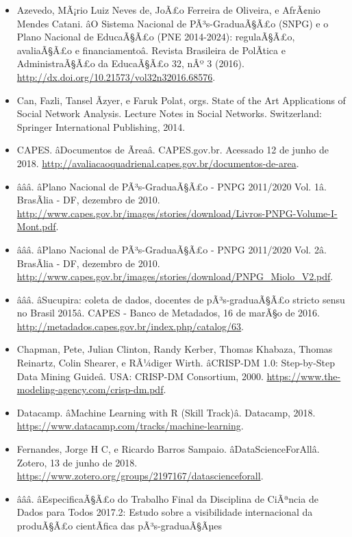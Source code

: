 \documentclass[]{article}
\providecommand{\tightlist}{%
  \setlength{\itemsep}{0pt}\setlength{\parskip}{0pt}}
\begin{document}
\begin{itemize}
\tightlist
\item
  Azevedo, MÃ¡rio Luiz Neves de, JoÃ£o Ferreira de Oliveira, e AfrÃ¢nio
  Mendes Catani. âO Sistema Nacional de PÃ³s-GraduaÃ§Ã£o (SNPG) e o
  Plano Nacional de EducaÃ§Ã£o (PNE 2014-2024): regulaÃ§Ã£o, avaliaÃ§Ã£o
  e financiamentoâ. Revista Brasileira de PolÃ­tica e AdministraÃ§Ã£o
  da EducaÃ§Ã£o 32, nÂº 3 (2016).
  \url{http://dx.doi.org/10.21573/vol32n32016.68576}.
\item
  Can, Fazli, Tansel Ãzyer, e Faruk Polat, orgs. State of the Art
  Applications of Social Network Analysis. Lecture Notes in Social
  Networks. Switzerland: Springer International Publishing, 2014.
\item
  CAPES. âDocumentos de Ãreaâ. CAPES.gov.br. Acessado 12 de junho
  de 2018.
  \url{http://avaliacaoquadrienal.capes.gov.br/documentos-de-area}.
\item
  âââ. âPlano Nacional de PÃ³s-GraduaÃ§Ã£o - PNPG 2011/2020 Vol.
  1â. BrasÃ­lia - DF, dezembro de 2010.
  \url{http://www.capes.gov.br/images/stories/download/Livros-PNPG-Volume-I-Mont.pdf}.
\item
  âââ. âPlano Nacional de PÃ³s-GraduaÃ§Ã£o - PNPG 2011/2020 Vol.
  2â. BrasÃ­lia - DF, dezembro de 2010.
  \url{http://www.capes.gov.br/images/stories/download/PNPG_Miolo_V2.pdf}.
\item
  âââ. âSucupira: coleta de dados, docentes de pÃ³s-graduaÃ§Ã£o
  stricto sensu no Brasil 2015â. CAPES - Banco de Metadados, 16 de
  marÃ§o de 2016.
  \url{http://metadados.capes.gov.br/index.php/catalog/63}.
\item
  Chapman, Pete, Julian Clinton, Randy Kerber, Thomas Khabaza, Thomas
  Reinartz, Colin Shearer, e RÃ¼diger Wirth. âCRISP-DM 1.0:
  Step-by-Step Data Mining Guideâ. USA: CRISP-DM Consortium, 2000.
  \url{https://www.the-modeling-agency.com/crisp-dm.pdf}.
\item
  Datacamp. âMachine Learning with R (Skill Track)â. Datacamp, 2018.
  \url{https://www.datacamp.com/tracks/machine-learning}.
\item
  Fernandes, Jorge H C, e Ricardo Barros Sampaio.
  âDataScienceForAllâ. Zotero, 13 de junho de 2018.
  \url{https://www.zotero.org/groups/2197167/datascienceforall}.
\item
  âââ. âEspecificaÃ§Ã£o do Trabalho Final da Disciplina de
  CiÃªncia de Dados para Todos 2017.2: Estudo sobre a visibilidade
  internacional da produÃ§Ã£o cientÃ­fica das pÃ³s-graduaÃ§Ãµes

\end{itemize}
\end{document}
